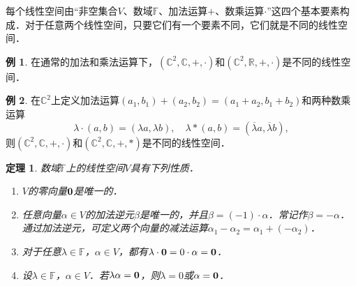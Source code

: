 \documentclass[a4paper,fontset=windows]{ctexbook}
\newtheorem{theorem}{定理}[chapter]
\theoremstyle{definition}
\newtheorem{example}{例}[chapter]
\begin{document}
每个线性空间由“非空集合$V$、数域$\mathbb{F}$、加法运算$+$、数乘运算$\cdot$”这四个基本要素构成．对于任意两个线性空间，只要它们有一个要素不同，它们就是不同的线性空间．

\begin{example}
在通常的加法和乘法运算下，$(\mathbb{C}^2,\mathbb{C},+,\cdot)$和$(\mathbb{C}^2,\mathbb{R},+,\cdot)$是不同的线性空间．
\end{example}

\begin{example}
在$\mathbb{C}^2$上定义加法运算$(a_1,b_1)+(a_2,b_2)=(a_1+a_2,b_1+b_2)$和两种数乘运算
$$\lambda\cdot(a,b)=(\lambda a,\lambda b),\quad\lambda*(a,b)=(\overline{\lambda}a,\overline{\lambda}b),$$
则$(\mathbb{C}^2,\mathbb{C},+,\cdot)$和$(\mathbb{C}^2,\mathbb{C},+,*)$是不同的线性空间．
\end{example}

\begin{theorem}\label{thm8.1}
数域$\mathbb{F}$上的线性空间$V$具有下列性质．
\begin{enumerate}
\item $V$的零向量${\bf 0}$是唯一的．

\item 任意向量$\alpha\in V$的加法逆元$\beta$是唯一的，并且$\beta=(-1)\cdot\alpha$．常记作$\beta=-\alpha$．\\ 通过加法逆元，可定义两个向量的减法运算$\alpha_1-\alpha_2=\alpha_1+(-\alpha_2)$．

\item 对于任意$\lambda\in\mathbb{F}$，$\alpha\in V$，都有$\lambda\cdot{\bf 0}=0\cdot\alpha={\bf 0}$．

\item 设$\lambda\in\mathbb{F}$，$\alpha\in V$．若$\lambda\alpha={\bf 0}$，则$\lambda=0$或$\alpha={\bf 0}$．
\end{enumerate}
\end{theorem}
\end{document}
